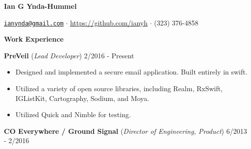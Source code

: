 \documentclass{article}
\begin{document}
\pagestyle{empty}


{
	{\large\bf Ian G Ynda-Hummel}
}

{
	\href{mailto:ianynda@gmail.com}{\tt ianynda@gmail.com}
	$\cdot$
	\url{https://github.com/ianyh}
	$\cdot$
	(323) 376-4858
}


\vspace{6mm}

%
%

{\large\bf Work Experience}\\

\vspace{-2mm}

{
	\hspace{2mm}
	{\bf PreVeil}
	({\em Lead Developer})
	\hfill
	2/2016 - Present
}

\vspace{1mm}

\begin{adjustwidth}{3mm}{5mm}
	\begin{itemize}
		\setlength\itemsep{-0.25mm}
		\item Designed and implemented a secure email application. Built entirely in swift.
		\item Utilized a variety of open source libraries, including Realm, RxSwift, IGListKit, Cartography, Sodium, and Moya.
		\item Utilized Quick and Nimble for testing.
	\end{itemize}
\end{adjustwidth}

\vspace{3mm}

{
	\hspace{2mm}
	{\bf CO Everywhere / Ground Signal}
	({\em Director of Engineering, Product})
	\hfill
	6/2013 - 2/2016
}

\vspace{1mm}
\end{document}
